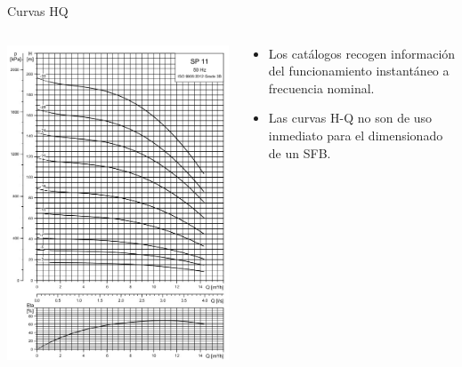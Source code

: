 \documentclass[xcolor={usenames,svgnames,dvipsnames}]{beamer}
\begin{document}
\begin{frame}[label={sec:org5c0ae8e}]{Curvas HQ}
\begin{columns}
\begin{column}{0.5\columnwidth}
\begin{center}
\includegraphics[height=0.8\textheight]{../figs/CurvaSP11.jpg}
\end{center}
\end{column}

\begin{column}{0.5\columnwidth}
\begin{itemize}
\item Los catálogos recogen información del funcionamiento instantáneo a frecuencia nominal.
\item Las curvas H-Q no son de uso inmediato para el dimensionado de un SFB.
\end{itemize}
\end{column}
\end{columns}
\end{frame}
\end{document}
